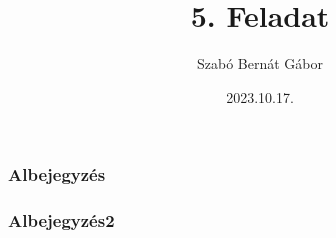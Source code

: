 \documentclass{book}
\begin{document}
\title{5. Feladat}
\author{Szabó Bernát Gábor}
\date{2023.10.17.}
\frontmatter
\maketitle
\tableofcontents
\mainmatter
\chapter{}
\subsection{Albejegyzés}
\subsection{Albejegyzés2}
\cite{bib}
\cite{bib}
\hulipsum[1]
\chapter{}
\hulipsum[1]
\chapter{}
\cite{bib}
\cite{bib}
\hulipsum[1]
\backmatter
\cleardoublepage
{}
\printindex
\end{document}
